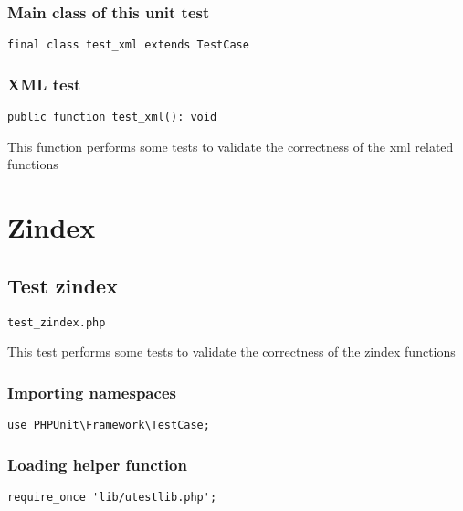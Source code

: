 \documentclass[a4paper]{article}
\begin{document}
\hypertarget{toc463}{}
\subsubsection{Main class of this unit test}

\begin{lstlisting}
final class test_xml extends TestCase
\end{lstlisting}

\hypertarget{toc464}{}
\subsubsection{XML test}

\begin{lstlisting}
public function test_xml(): void
\end{lstlisting}

This function performs some tests to validate the correctness
of the xml related functions


\hypertarget{toc465}{}
\section{Zindex}

\hypertarget{toc466}{}
\subsection{Test zindex}

\begin{lstlisting}
test_zindex.php
\end{lstlisting}

This test performs some tests to validate the correctness
of the zindex functions

\hypertarget{toc467}{}
\subsubsection{Importing namespaces}

\begin{lstlisting}
use PHPUnit\Framework\TestCase;
\end{lstlisting}

\hypertarget{toc468}{}
\subsubsection{Loading helper function}

\begin{lstlisting}
require_once 'lib/utestlib.php';
\end{lstlisting}
\end{document}
